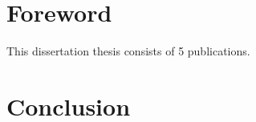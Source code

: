 \documentclass[twoside]{ctuthesis}
\begin{document}
\nocite{DBLP:conf/cade/Bartek020}
\nocite{DBLP:conf/cade/Bartek021}
\nocite{DBLP:conf/lpar/Bartek023}
\nocite{DBLP:conf/ijcar/BartekCS24}
\nocite{DBLP:conf/paar/BartekC024}
\nocite{bartek10814478}



\maketitle

\chapter*{Foreword}

This dissertation thesis consists of 5 publications.

\glsresetall





\chapter{Conclusion}

\end{document}
